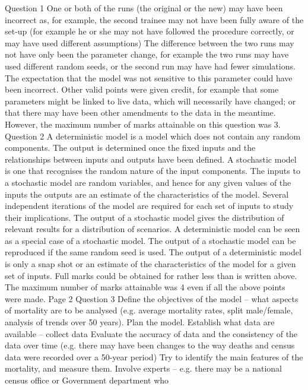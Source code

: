 \documentclass[a4paper,12pt]{article}
\begin{document}
\begin{enumerate}
Question 1
One or both of the runs (the original or the new) may have been incorrect as, for example, the
second trainee may not have been fully aware of the set-up (for example he or she may not
have followed the procedure correctly, or may have used different assumptions)
The difference between the two runs may not have only been the parameter change, for
example the two runs may have used different random seeds, or the second run may have had
fewer simulations.
The expectation that the model was not sensitive to this parameter could have been incorrect.
Other valid points were given credit, for example that some parameters might be linked to
live data, which will necessarily have changed; or that there may have been other
amendments to the data in the meantime. However, the maximum number of marks
attainable on this question was 3.
Question 2
A deterministic model is a model which does not contain any random components.
The output is determined once the fixed inputs and the relationships between inputs and
outputs have been defined.
A stochastic model is one that recognises the random nature of the input components.
The inputs to a stochastic model are random variables, and hence for any given values of the
inputs the outputs are an estimate of the characteristics of the model.
Several independent iterations of the model are required for each set of inputs to study their
implications.
The output of a stochastic model gives the distribution of relevant results for a distribution
of scenarios.
A deterministic model can be seen as a special case of a stochastic model.
The output of a stochastic model can be reproduced if the same random seed is used.
The output of a deterministic model is only a snap shot or an estimate of the characteristics
of the model for a given set of inputs.
Full marks could be obtained for rather less than is written above. The maximum number
of marks attainable was 4 even if all the above points were made.
Page 2 %
Question 3
Define the objectives of the model – what aspects of mortality are to be analysed (e.g.
average mortality rates, split male/female, analysis of trends over 50 years).
Plan the model.
Establish what data are available – collect data
Evaluate the accuracy of data and the consistency of the data over time (e.g. there may have
been changes to the way deaths and census data were recorded over a 50-year period)
Try to identify the main features of the mortality, and measure them.
Involve experts – e.g. there may be a national census office or Government department who

\end{enumerate}
\end{document}
